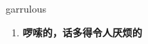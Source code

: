 
\begin{frame}
{\huge garrulous}
\begin{center}
\begin{enumerate}\Large
  \item \textbf{啰嗦的，话多得令人厌烦的}
\end{enumerate}
\end{center}
\end{frame}

